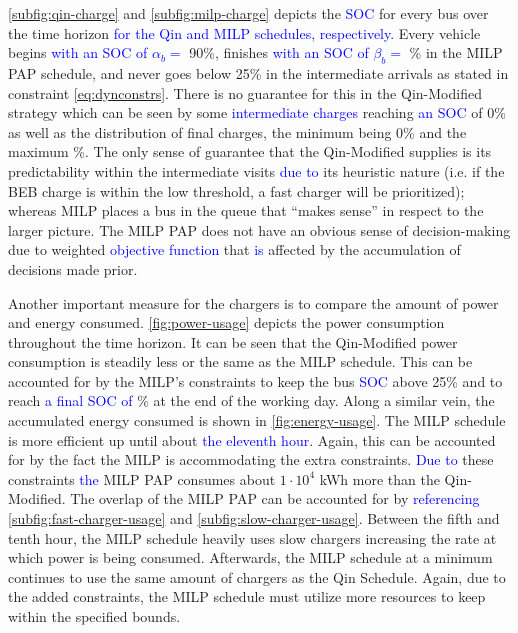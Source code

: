 \documentclass[utf8]{FrontiersinHarvard}
\newcommand{\bcharge}{0.7 }                                                     %
\newcommand{\mincharge}{25\% }                                                  %
\newcommand{\batsize}{388 }                                                     %
\begin{document}
\autoref{subfig:qin-charge} and \autoref{subfig:milp-charge} depicts the \textcolor{blue}{SOC} for every bus
over the time horizon \textcolor{blue}{for the Qin and MILP schedules, respectively}. Every vehicle begins
\textcolor{blue}{with an SOC of $\alpha_b = $} 90\%, finishes \textcolor{blue}{with an SOC of $\beta_b =$}
\fpeval{\bcharge *100}\% in the MILP PAP schedule, and never goes below \mincharge in the intermediate arrivals as stated
in constraint \autoref{eq:dynconstrs}. There is no guarantee for this in the Qin-Modified strategy which can be seen by
some \textcolor{blue}{intermediate charges} reaching \textcolor{blue}{an SOC} of 0\% as well as the
distribution of final charges, the minimum being 0\% and the maximum \fpeval{trunc(\fpeval{368 / \batsize * 100}, 3)}\%. The only sense of guarantee that the Qin-Modified supplies is its predictability within the intermediate
visits \textcolor{blue}{due to} its heuristic nature (i.e. if the BEB charge is within the low threshold, a
fast charger will be prioritized); whereas MILP places a bus in the queue that ``makes sense'' in respect to the larger
picture. The MILP PAP does not have an obvious sense of decision-making due to weighted
\textcolor{blue}{objective function} that \textcolor{blue}{is} affected by the accumulation of
decisions made prior.

Another important measure for the chargers is to compare the amount of power and energy consumed.
\autoref{fig:power-usage} depicts the power consumption throughout the time horizon. It can be seen that the
Qin-Modified power consumption is steadily less or the same as the MILP schedule. This can be accounted for by the
MILP's constraints to keep the bus \textcolor{blue}{SOC} above \mincharge and to reach
\textcolor{blue}{a final SOC of} \fpeval{\bcharge *100}\% at the end of the working day. Along a similar vein,
the accumulated energy consumed is shown in \autoref{fig:energy-usage}. The MILP schedule is more efficient up until
about \textcolor{blue}{the eleventh hour}. Again, this can be accounted for by the fact the MILP is
accommodating the extra constraints. \textcolor{blue}{Due to} these constraints
\textcolor{blue}{the} MILP PAP consumes about \(1\cdot10^4\) kWh more than the Qin-Modified. The overlap of the
MILP PAP can be accounted for by \textcolor{blue}{referencing} \autoref{subfig:fast-charger-usage} and
\autoref{subfig:slow-charger-usage}. Between the fifth and tenth hour, the MILP schedule heavily uses slow chargers
increasing the rate at which power is being consumed. Afterwards, the MILP schedule at a minimum continues to use the
same amount of chargers as the Qin Schedule. Again, due to the added constraints, the MILP schedule must utilize more
resources to keep within the specified bounds.
\end{document}
